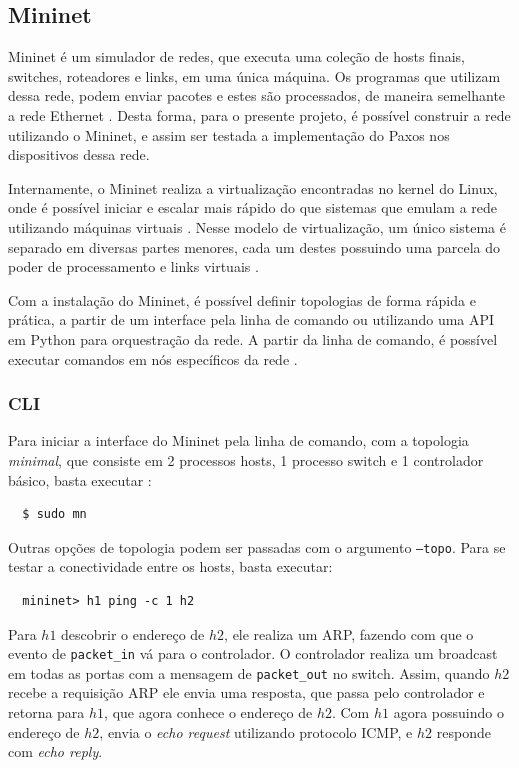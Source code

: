 \documentclass[12pt,
openright, 
oneside,
a4paper,
brazil]{facom-ufu-abntex2}
\theoremstyle{definition}
\begin{document}
\subsection{Mininet}
Mininet é um simulador de redes, que executa uma coleção de hosts finais, switches, 
roteadores e links, em uma única máquina. Os programas que utilizam dessa rede, podem enviar
pacotes e estes são processados, de maneira semelhante a rede Ethernet \citep{mininetDocs}.
Desta forma, para o presente projeto, é possível construir a rede utilizando o Mininet, e 
assim ser testada a implementação do Paxos nos dispositivos dessa rede.

Internamente, o Mininet realiza a virtualização encontradas no kernel do Linux, onde é possível
iniciar e escalar mais rápido do que sistemas que emulam a rede utilizando máquinas virtuais
\citep{mininetDocs}. Nesse modelo de virtualização, um único sistema é separado em diversas
partes menores, cada um destes possuindo uma parcela do poder de processamento e links virtuais
\citep{mininetDocs}.

Com a instalação do Mininet, é possível definir topologias de forma rápida e prática, a partir
de um interface pela linha de comando ou utilizando uma API em Python para orquestração da rede.
A partir da linha de comando, é possível executar comandos em nós específicos da rede 
\citep{mininetDocs}. 

\subsubsection{CLI}
Para iniciar a interface do Mininet pela linha de comando, com a topologia
\textit{minimal}, que consiste em 2 processos hosts, 1 processo switch e 1 controlador
básico, basta executar \citep{mininetOrg}:

\begin{verbatim}
  $ sudo mn
\end{verbatim}

Outras opções de topologia podem ser passadas com o argumento \texttt{--topo}. Para se testar a
conectividade entre os hosts, basta executar:

\begin{verbatim}
  mininet> h1 ping -c 1 h2
\end{verbatim}

Para $h1$ descobrir o endereço de $h2$, ele realiza um ARP, fazendo com que o evento de 
\texttt{packet\_in} vá para o controlador. O controlador realiza um broadcast em todas as portas
com a mensagem de \texttt{packet\_out} no switch. Assim, quando $h2$ recebe a requisição ARP ele
envia uma resposta, que passa pelo controlador e retorna para $h1$, que agora conhece o endereço
de $h2$. Com $h1$ agora possuindo o endereço de $h2$, envia o \textit{echo request} utilizando
protocolo ICMP, e $h2$ responde com \textit{echo reply}.
\end{document}
